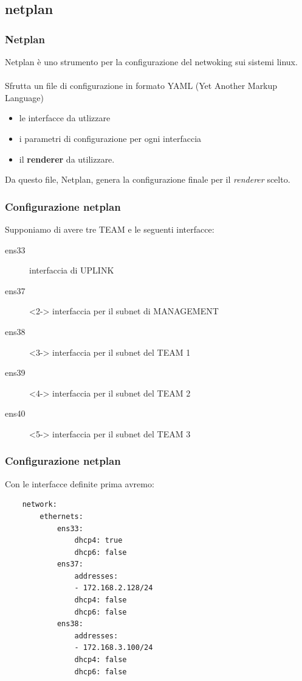 \documentclass{beamer}
\begin{document}
\subsection*{netplan}

\begin{frame}
    \frametitle{Netplan}

     {Netplan è uno strumento per la configurazione del netwoking sui sistemi linux.}
    \\~\\
     {Sfrutta un file di configurazione in formato YAML (Yet Another Markup Language)} 
    \begin{itemize}
        \item <3-> le interfacce da utlizzare
        \item <4-> i parametri di configurazione per ogni interfaccia
        \item <5-> il \textbf{renderer} da utilizzare.
    \end{itemize}
     {Da questo file, Netplan, genera la configurazione finale per il \textit{renderer} scelto.}
\end{frame}

\begin{frame}
    \frametitle{Configurazione netplan}
    Supponiamo di avere tre TEAM e le seguenti interfacce:
    \begin{description}
        \item [ens33] interfaccia di UPLINK
        \item [ens37]<2-> interfaccia per il subnet di MANAGEMENT
        \item [ens38]<3-> interfaccia per il subnet del TEAM 1 
        \item [ens39]<4-> interfaccia per il subnet del TEAM 2
        \item [ens40]<5-> interfaccia per il subnet del TEAM 3
    \end{description}
\end{frame}

\begin{frame}[fragile]
    \frametitle{Configurazione netplan}
    Con le interfacce definite prima avremo:
    \begin{lstlisting}
    network:
        ethernets:
            ens33:
                dhcp4: true
                dhcp6: false
            ens37:
                addresses:
                - 172.168.2.128/24
                dhcp4: false
                dhcp6: false
            ens38:
                addresses:
                - 172.168.3.100/24
                dhcp4: false
                dhcp6: false
    \end{lstlisting}
\end{frame}
\end{document}
